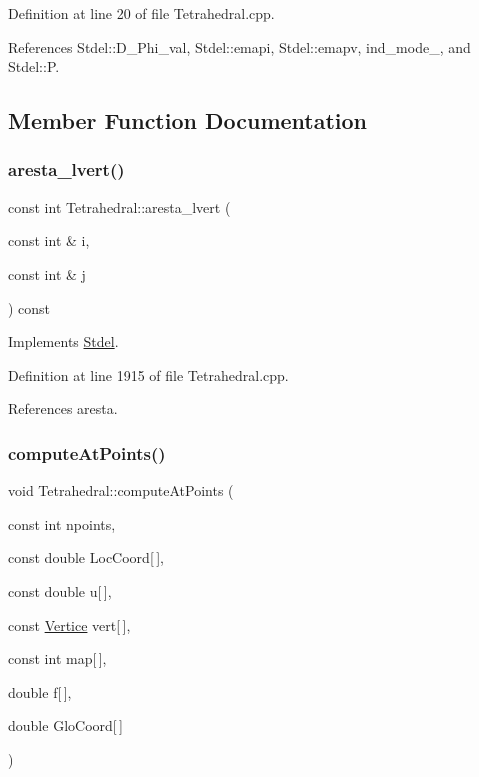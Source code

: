 Definition at line 20 of file Tetrahedral.\+cpp.



References Stdel\+::\+D\+\_\+\+Phi\+\_\+val, Stdel\+::emapi, Stdel\+::emapv, ind\+\_\+mode\+\_\+, and Stdel\+::P.



\subsection{Member Function Documentation}
\mbox{\label{classTetrahedral_af307024c2e9c29d98b46b961208e1c0d}} 
\subsubsection{\texorpdfstring{aresta\+\_\+lvert()}{aresta\_lvert()}}
{\footnotesize\ttfamily const int Tetrahedral\+::aresta\+\_\+lvert (\begin{DoxyParamCaption}\item[{const int \&}]{i,  }\item[{const int \&}]{j }\end{DoxyParamCaption}) const\hspace{0.3cm}{\ttfamily [virtual]}}



Implements \hyperlink{classStdel_a69b8ef7def7891fcb2d5d8fd9b75bdc8}{Stdel}.



Definition at line 1915 of file Tetrahedral.\+cpp.



References aresta.

\mbox{\label{classTetrahedral_afba2976521f6a8f5dab936879d3f16da}} 
\subsubsection{\texorpdfstring{compute\+At\+Points()}{computeAtPoints()}}
{\footnotesize\ttfamily void Tetrahedral\+::compute\+At\+Points (\begin{DoxyParamCaption}\item[{const int}]{npoints,  }\item[{const double}]{Loc\+Coord\mbox{[}$\,$\mbox{]},  }\item[{const double}]{u\mbox{[}$\,$\mbox{]},  }\item[{const \hyperlink{structVertice}{Vertice}}]{vert\mbox{[}$\,$\mbox{]},  }\item[{const int}]{map\mbox{[}$\,$\mbox{]},  }\item[{double}]{f\mbox{[}$\,$\mbox{]},  }\item[{double}]{Glo\+Coord\mbox{[}$\,$\mbox{]} }\end{DoxyParamCaption})\hspace{0.3cm}{\ttfamily [virtual]}}



